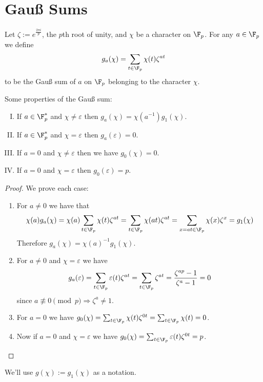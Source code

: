 \section{Gau{\ss} Sums}

\begin{definition}
    Let \(\zeta := e^{\frac{2\pi i}{p}}\), the \(p\)th root of unity, and
    \(\chi\) be a character on \(\F_p\). For any \(a \in \F_p\) we define
    \[
        g_a(\chi) = \sum_{t \in \F_p} \chi(t) \zeta^{at}
    \]
    to be the Gau{\ss} sum of \(a\) on \(\F_p\) belonging to the character
    \(\chi\).
\end{definition}

\begin{proposition}
    Some properties of the Gau{\ss} sum:
    \begin{enumerate}[I.]
        \item If \(a \in \F_p^\ast\) and \(\chi \neq \varepsilon\) then
              \(g_a(\chi) = \chi(a^{-1})g_1(\chi)\).
        \item If \(a \in \F_p^\ast\) and \(\chi = \varepsilon\) then
              \(g_a(\varepsilon) = 0\).
        \item If \(a = 0\) and  \(\chi \neq  \varepsilon\) then  we have
              \(g_0(\chi) = 0\).
        \item  If \(a = 0\) and \(\chi = \varepsilon\) then \(g_0(\varepsilon) =
              p\).
    \end{enumerate}
\end{proposition}

\begin{proof}
    We prove each case:
    \begin{enumerate}
        \item For \(a \neq  0\) we have that
              \[
                  \chi(a)g_a(\chi) = \chi(a) \sum_{t \in \F_p} \chi(t) \zeta^{at}
                  = \sum_{t \in \F_p} \chi(at) \zeta^{at}
                  = \sum_{x = at \in \F_p} \chi(x) \zeta^x
                  = g_1(\chi)
              \]
              Therefore \(g_a(\chi) = \chi(a)^{-1} g_1(\chi)\).
        \item For \(a \neq  0\) and \(\chi = \varepsilon\) we have
              \[
                  g_a(\varepsilon) = \sum_{t \in \F_p} \varepsilon(t)\zeta^{at} =
                  \sum_{t \in \F_p}\zeta^{at} = \frac{\zeta^{ap} - 1}{\zeta^a - 1} = 0
              \]
              since \(a \not\equiv 0 \pmod{p} \Rightarrow \zeta^{a} \neq 1\).
        \item For \(a = 0\) we have  \(g_0(\chi) = \sum_{t \in \F_p} \chi(t)
              \zeta^{0t} = \sum_{t \in \F_p} \chi(t) = 0\).
        \item Now if \(a = 0\) and \(\chi = \varepsilon\) we have \(g_0(\chi) =
              \sum_{t \in \F_p} \varepsilon(t) \zeta^{0t} = p\).
    \end{enumerate}
\end{proof}

\begin{remark}
    We'll use \(g(\chi) := g_1(\chi)\) as a notation.
\end{remark}
